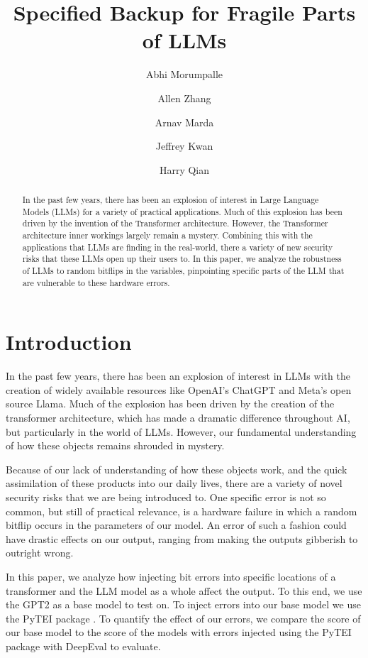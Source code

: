 \documentclass[a4paper]{article}
\title{Specified Backup for Fragile Parts of LLMs}
\author{
Abhi Morumpalle
\and
Allen Zhang
\and
Arnav Marda
\and
Jeffrey Kwan
\and
Harry Qian
}
\begin{document}
\maketitle

\begin{abstract}
In the past few years, there has been an explosion of interest in Large Language Models (LLMs) for a variety of practical applications. Much of this explosion has been driven by the invention of the Transformer architecture. However, the Transformer architecture inner workings largely remain a mystery. Combining this with the applications that LLMs are finding in the real-world, there a variety of new security risks that these LLMs open
up their users to. In this paper, we analyze the robustness of LLMs to random bitflips in the variables, pinpointing specific parts of the LLM that are vulnerable to these hardware errors.


\end{abstract}


\section{Introduction}

In the past few years, there has been an explosion of interest in LLMs with the creation of widely available resources like OpenAI's ChatGPT
and Meta's open source Llama. Much of the explosion has been driven by the creation of the transformer architecture, which has made a dramatic difference throughout AI, but particularly in the world of LLMs. However, our fundamental understanding of how these objects remains shrouded in mystery.

Because of our lack of understanding of how these objects work, and the quick assimilation of these products into our daily lives, there are a variety of novel security risks that we are being introduced to. One specific error is not so common, but still of practical relevance, is a hardware failure in which a random bitflip occurs in the parameters of our model. An error of such a fashion could have drastic effects on our output, ranging from making the outputs gibberish to outright wrong.

In this paper, we analyze how injecting bit errors into specific locations of a transformer and the LLM model as a whole affect the output. To this end, we use the GPT2 as a base model to test on. To inject errors into our base model we use the PyTEI package \cite{Ma23}. To quantify the effect of our errors, we compare the score of our base model to the score of the models with errors injected using the PyTEI package with DeepEval to evaluate.
\end{document}
